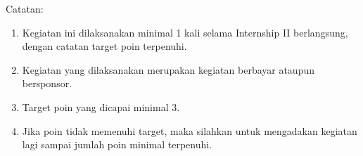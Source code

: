 Catatan:
\begin{enumerate}
\item Kegiatan ini dilaksanakan minimal 1 kali selama Internship II berlangsung, dengan catatan target poin terpenuhi.
\item Kegiatan yang dilaksanakan merupakan kegiatan berbayar ataupun bersponsor.
\item Target poin yang dicapai minimal 3.
\item Jika poin tidak memenuhi target, maka silahkan untuk mengadakan kegiatan lagi sampai jumlah poin minimal terpenuhi.
\end{enumerate} 